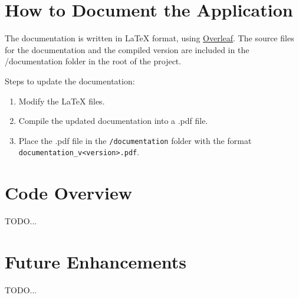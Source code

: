 \documentclass[12pt,a4paper]{report}
\begin{document}
\section{How to Document the Application}
The documentation is written in LaTeX format, using \href{https://www.overleaf.com/project/677243f613cd740ebdf0d957}{Overleaf}. The source files for the documentation and the compiled version are included in the /documentation folder in the root of the project.

Steps to update the documentation:
\begin{enumerate}
    \item Modify the LaTeX files.
    \item Compile the updated documentation into a .pdf file.
    \item Place the .pdf file in the \texttt{/documentation} folder with the format \texttt{documentation\_v<version>.pdf}.
\end{enumerate}

\section{Code Overview}
TODO...

\section{Future Enhancements}
TODO...
\end{document}
